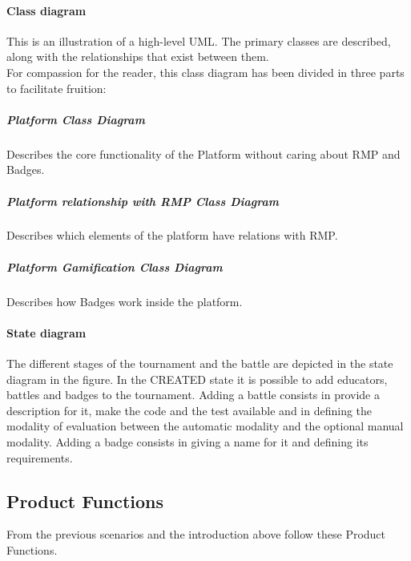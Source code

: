 \paragraph{Class diagram}
This is an illustration of a high-level UML. The primary classes are described, along with the relationships that exist between them.
\\For compassion for the reader, this class diagram has been divided in three parts to facilitate fruition:
\newpage
\subparagraph{Platform Class Diagram}
Describes the core functionality of the Platform without caring about RMP and Badges.\\
\newpage
\subparagraph{Platform relationship with RMP Class Diagram}
Describes which elements of the platform have relations with RMP.\\
\subparagraph{Platform Gamification Class Diagram}
Describes how Badges work inside the platform.\\
\newpage 

\paragraph{State diagram}
The different stages of the tournament and the battle are depicted in the state diagram in the figure.
In the CREATED state it is possible to add educators, battles and badges to the tournament.
Adding a battle consists in provide a description for it, make the code and the test available and in defining the modality of evaluation between the automatic modality and the optional manual modality.
Adding a badge consists in giving a name for it and defining its requirements.
\newpage

\subsection{Product Functions}
From the previous scenarios and the introduction above follow these Product Functions.

